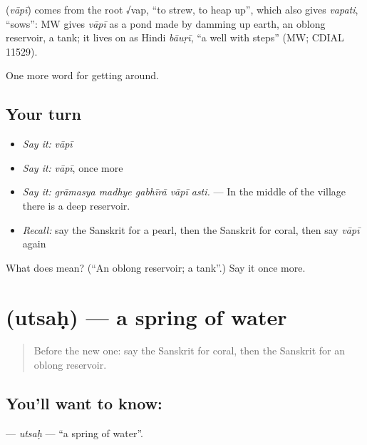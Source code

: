 \begin{cousinweb}
\textbf{} (\emph{vāpī}) comes from the root √vap, \textquotedblleft{}to strew, to heap up\textquotedblright{}, which also gives \emph{vapati}, \textquotedblleft{}sows\textquotedblright{}: MW gives \emph{vāpī} as a pond made by damming up earth, an oblong reservoir, a tank; it lives on as Hindi \emph{bāuṛī}, \textquotedblleft{}a well with steps\textquotedblright{} (MW; CDIAL 11529).
\end{cousinweb}

\begin{grammarlens}[title={What you've built}]
One more word for getting around.
\end{grammarlens}

\subsection*{Your turn}
\begin{itemize}
\raggedright
  \item \emph{Say it:} \emph{vāpī}
  \item \emph{Say it:} \emph{vāpī}, once more
  \item \emph{Say it:} \emph{grāmasya madhye gabhīrā vāpī asti.} — In the middle of the village there is a deep reservoir.
  \item \emph{Recall:} say the Sanskrit for a pearl, then the Sanskrit for coral, then say \emph{vāpī} again
\end{itemize}

\begin{tcolorbox}[breakable,colback=teal!4,colframe=teal!35!black,title={Before you move on}]
What does  mean? (\textquotedblleft{}An oblong reservoir; a tank\textquotedblright{}.) Say it once more.
\end{tcolorbox}
\section[\texorpdfstring{\sk{उत्सः} (utsaḥ)}{उत्सः (utsaḥ)}]{ (utsaḥ) — a spring of water}

\label{lesson:SA-C419-utsah}



\begin{quote}
Before the new one: say the Sanskrit for coral, then the Sanskrit for an oblong reservoir.
\end{quote}

\subsection*{You'll want to know: }
\textbf{} — \emph{utsaḥ} — \textquotedblleft{}a spring of water\textquotedblright{}.

